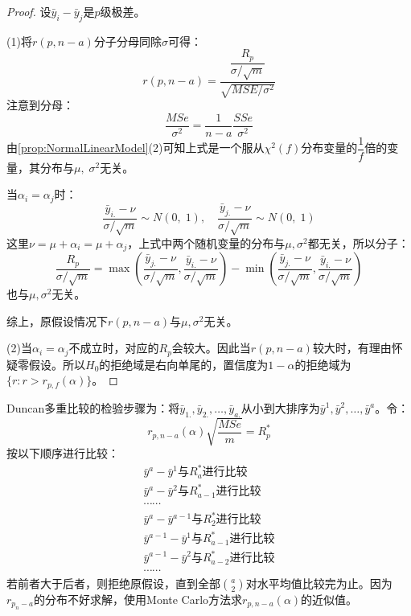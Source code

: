 \begin{proof}
	设$\bar{y}_i-\bar{y}_j$是$p$级极差。\par
	(1)将$r(p,n-a)$分子分母同除$\sigma$可得：
	\begin{equation*}
		r(p,n-a)=\frac{\dfrac{R_p}{\sigma/\sqrt{m}}}{\sqrt{MSE/\sigma^2}}
	\end{equation*}
	注意到分母：
	\begin{equation*}
		\frac{MSe}{\sigma^2}=\frac{1}{n-a}\frac{SSe}{\sigma^2}
	\end{equation*}
	由\cref{prop:NormalLinearModel}(2)可知上式是一个服从$\chi^2(f)$分布变量的$\dfrac{1}{f}$倍的变量，其分布与$\mu,\;\sigma^2$无关。\par
	当$\alpha_i=\alpha_j$时：
	\begin{equation*}
		\frac{\bar{y}_{i.}-\nu}{\sigma/\sqrt{m}}\sim N(0,\;1),\quad\frac{\bar{y}_{j.}-\nu}{\sigma/\sqrt{m}}\sim N(0,\;1)
	\end{equation*}
	这里$\nu=\mu+\alpha_i=\mu+\alpha_j$，上式中两个随机变量的分布与$\mu,\sigma^2$都无关，所以分子：
	\begin{equation*}
		\frac{R_p}{\sigma/\sqrt{m}}=\max(\frac{\bar{y}_{j.}-\nu}{\sigma/\sqrt{m}},\frac{\bar{y}_{i.}-\nu}{\sigma/\sqrt{m}})-\min(\frac{\bar{y}_{j.}-\nu}{\sigma/\sqrt{m}},\frac{\bar{y}_{i.}-\nu}{\sigma/\sqrt{m}})
	\end{equation*}
	也与$\mu,\sigma^2$无关。\par
	综上，原假设情况下$r(p,n-a)$与$\mu,\sigma^2$无关。\par
	(2)当$\alpha_i=\alpha_j$不成立时，对应的$R_p$会较大。因此当$r(p,n-a)$较大时，有理由怀疑零假设。所以$H_0$的拒绝域是右向单尾的，置信度为$1-\alpha$的拒绝域为$\{r:r>r_{p,f}(\alpha)\}$。
\end{proof}
\begin{note}
	Duncan多重比较的检验步骤为：将$\bar{y}_{1.},\bar{y}_{2.},\dots,\bar{y}_{a.}$从小到大排序为$\bar{y}^1,\bar{y}^2,\dots,\bar{y}^a$。令：
	\begin{equation*}
		r_{p,n-a}(\alpha)\sqrt{\frac{MSe}{m}}=R_p^*
	\end{equation*}
	按以下顺序进行比较：
	\begin{gather*}
		\bar{y}^a-\bar{y}^1\text{与$R_a^*$进行比较} \\
		\bar{y}^a-\bar{y}^2\text{与$R_{a-1}^*$进行比较} \\
		\cdots\cdots \\
		\bar{y}^a-\bar{y}^{a-1}\text{与$R_2^*$进行比较} \\
		\bar{y}^{a-1}-\bar{y}^1\text{与$R_{a-1}^*$进行比较} \\
		\bar{y}^{a-1}-\bar{y}^2\text{与$R_{a-2}^*$进行比较} \\
		\cdots\cdots
	\end{gather*}
	若前者大于后者，则拒绝原假设，直到全部$\binom{a}{2}$对水平均值比较完为止。因为$r_{p_n-a}$的分布不好求解，使用Monte Carlo方法求$r_{p,n-a}(\alpha)$的近似值。
\end{note}
